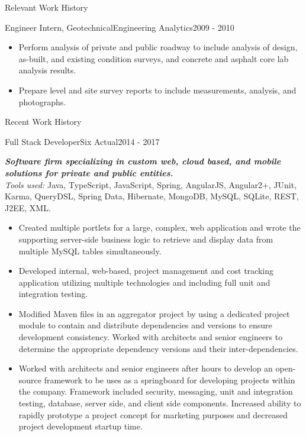 \documentclass[]{mcdowellcv}
\newcommand{\smallspace}{\vspace{2pt}}
\newcommand{\compDesc}[1]{
	\textbf{\textit{#1}}
	\smallspace\\
}
\newcommand{\tools}[1]{
	\textit{Tools used: }#1
	\smallspace
}
\begin{document}
\begin{cvsection}{Relevant Work History}
\begin{cvsubsection}{Engineer Intern, Geotechnical}{Engineering Analytics}{2009 - 2010}
\begin{itemize}
			\smallspace
			\item Perform analysis of private and public roadway to include analysis of design, as-built, and existing condition surveys, and concrete and asphalt core lab analysis results.
			
			\smallspace
			\item Prepare level and site survey reports to include measurements, analysis, and photographs. 
		\end{itemize}
	\end{cvsubsection}

\end{cvsection}
\begin{cvsection}{Recent Work History}
	\begin{cvsubsection}{Full Stack Developer}{Six Actual}{2014 - 2017}
		\compDesc{Software firm specializing in custom web, cloud based, and mobile solutions for private and public entities.}
		\tools{Java, TypeScript, JavaScript, Spring, AngularJS, Angular2+, JUnit, Karma, QueryDSL, Spring Data, Hibernate, MongoDB, MySQL, SQLite, REST, J2EE, XML.}
		\begin{itemize}  
			\item Created multiple portlets for a large, complex, web application and wrote the supporting server-side business logic to retrieve and display data from multiple MySQL tables simultaneously.
			\smallspace
			\item Developed internal, web-based, project management and cost tracking application utilizing multiple technologies and including full unit and integration testing.
			\smallspace
			\item Modified Maven files in an aggregator project by using a dedicated project module to contain and distribute dependencies and versions to ensure development consistency.  Worked with architects and senior engineers to determine the appropriate dependency versions and their inter-dependencies.
			\smallspace
			\item Worked with architects and senior engineers after hours to develop an open-source framework to be uses as a springboard for developing projects within the company.  Framework included security, messaging, unit and integration testing, database, server side, and client side components.  Increased ability to rapidly prototype a project concept for marketing purposes and decreased project development startup time.
		\end{itemize}
	\end{cvsubsection}
\end{cvsection}
\end{document}

